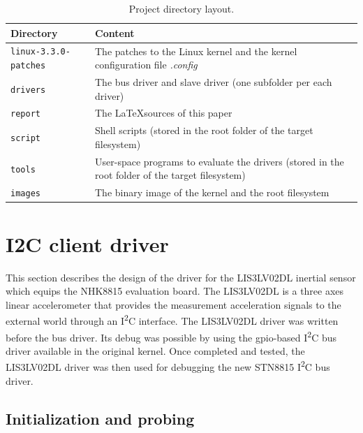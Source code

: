 \documentclass[a4paper,10pt]{article}
\newcommand{\icc}{I\textsuperscript{2}C }
\begin{document}
\begin{multicols}{2}
\begin{table}
	\centering
	\renewcommand{\arraystretch}{1.2}	
	\begin{tabular}{p{5cm} p{11cm}}
		\hline
		Directory & Content \\
		\hline
		\texttt{linux-3.3.0-patches} & The patches to the Linux kernel and the 
			kernel configuration file \emph{.config}\\
		\texttt{drivers} & The bus driver and slave driver (one subfolder per
			each driver) \\
		\texttt{report} & The \LaTeX sources of this paper \\
		\texttt{script} & Shell scripts (stored in the root folder of the target
			filesystem) \\
		\texttt{tools} & User-space programs to evaluate the drivers (stored in
			the root folder of the target filesystem) \\
		\texttt{images} & The binary image of the kernel and the root
			filesystem \\
		\hline
	\end{tabular}
	\caption{Project directory layout.}
	\label{table:project-dir-layout}
\end{table}




\section{I2C client driver}
\label{sec:i2c_client_driver}

This section describes the design of the driver for the LIS3LV02DL inertial
sensor which equips the NHK8815 evaluation board.
The LIS3LV02DL is a three axes linear accelerometer that provides the measurement acceleration signals to the external world through an \icc interface.
The LIS3LV02DL driver was written before the bus driver. Its debug was possible
by using the gpio-based \icc bus driver available in the original kernel. Once
completed and tested, the LIS3LV02DL driver was then used for debugging the new
STN8815 \icc bus driver.\\



\subsection{Initialization and probing}
\label{sec:lis3_init_probe}


\end{multicols}
\end{document}
